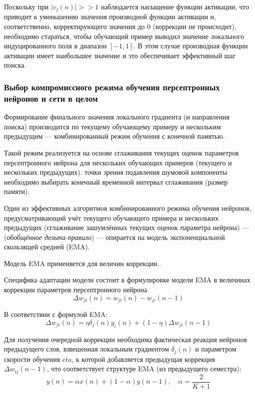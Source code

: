 \documentclass{article}
\numberwithin{equation}{subsection}
\begin{document}
Поскольку при $\lvert v_j(n) \rvert >> 1$ наблюдается насыщение функции активации,
что приводит к уменьшению значения производной функции активации и, соответственно,
корректирующего значения до 0 (коррекции не происходит), необходимо стараться, чтобы
обучающий пример выводил значение локального индуцированного поля 
в диапазон $\left[-1,1\right]$.
В этом случае производная функции активации имеет наибольшее значение и это обеспечивает
эффективный шаг поиска.




\subsubsection{Выбор компромиссного режима обучения персептронных нейронов и сети в целом}

Формирование финального значения локального градиента (и направления поиска) производится
по текущему обучающему примеру и нескольким предыдущим --- комбинированный режим обучения
с конечной памятью.

Такой режим реализуется на основе сглаживания текущих оценок параметров персептронного 
нейрона для нескольких обучающих примеров (текущего и нескольких предыдущих).
точки зрения подавления шумовой компоненты необходимо выбирать конечный временной 
интервал сглаживания (размер памяти). 

Один из эффективных алгоритмов комбинированного режима обучения нейронов, предусматривающий
учёт текущего обучающего примера и нескольких предыдущих (сглаживание зашумлённых 
текущих оценок параметра нейрона) --- (\textit{обобщённое дельта-правило}) --- опирается 
на модель экспоненциальной скользящей средней (EMA).

Модель EMA применяется для величин коррекции..

Специфика адаптации модели состоит в формулировке модели EMA в величинах коррекции 
параметров персептронного нейрона
\begin{equation}
    \Delta w_{ji}(n) = w_{ji}(n) - w_{ji}(n-1)
\end{equation}

В соответствии с формулой EMA:
\begin{equation}
    \Delta w_{ji}(n) = \eta \delta_j(n) y_i(n) + (1-\eta) \Delta w_{ji}(n-1)
\end{equation}

Для получения очередной коррекции необходима фактическая реакция нейронов предыдущего
слоя, взвешенная локальным градиентом $\delta_j(n)$ и параметром скорости обучения $eta$,
к которой добавляется предыдущая коррекция $\Delta w_{ij}(n-1)$, что соответствует
структуре EMA (из предыдущего семестра):
\begin{equation}
    y(n)=\alpha x(n) + (1 - \alpha) y(n-1), \quad \alpha = \dfrac{2}{K+1}
\end{equation}
\end{document}
